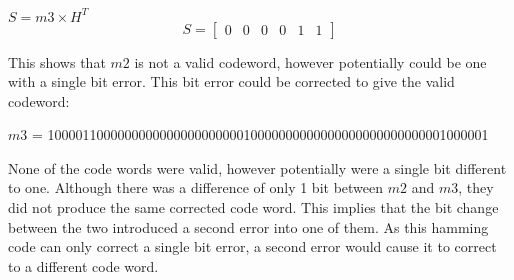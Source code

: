 $S = m3 \times H^{T}$ \\
\[ S = \left[ \begin{array}{cccccc} 0 & 0 & 0 & 0 & 1 & 1 \end{array} \right] \]

This shows that $m2$ is not a valid codeword, however potentially could be one with a single bit error.
This bit error could be corrected to give the valid codeword:

$m3$ = 100001100000000000000000000010000000000000000000000000001000001

None of the code words were valid, however potentially were a single bit different to one.
Although there was a difference of only 1 bit between $m2$ and $m3$, they did not produce the same corrected code word.
This implies that the bit change between the two introduced a second error into one of them.
As this hamming code can only correct a single bit error, a second error would cause it to correct to a different code word.
